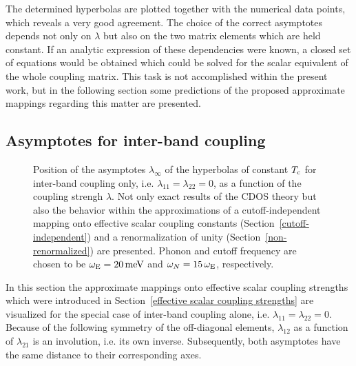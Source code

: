 The determined hyperbolas are plotted together with the numerical data points,
which reveals a very good agreement. The choice of the correct asymptotes
depends not only on $\lambda$ but also on the two matrix elements which are held
constant. If an analytic expression of these dependencies were known, a closed
set of equations would be obtained which could be solved for the scalar
equivalent of the whole coupling matrix. This task is not accomplished within
the present work, but in the following section some predictions of the proposed
approximate mappings regarding this matter are presented.

\subsection{Asymptotes for inter-band coupling}

\begin{figure}
    \small
    
    
    \caption[Asymptotes for inter-band coupling]{
        Position of the asymptotes $\lambda_\infty$ of the hyperbolas of
        constant $T \sb{\text{c}}$ for inter-band coupling only, i.e. $\lambda_{1 1} =
        \lambda_{2 2} = 0$, as a function of the coupling strengh $\lambda$. Not
        only exact results of the CDOS  theory but also the
        behavior within the approximations of a cutoff-independent mapping onto
        effective scalar coupling constants (Section~\ref{cutoff-independent})
        and a renormalization of unity (Section~\ref{non-renormalized}) are
        presented. Phonon and cutoff frequency are chosen to be $\omega \sb{\text{E}} =
        20 \, \mathrm{meV}$ and $\omega_N = 15 \, \omega \sb{\text{E}}$, respectively.}
    \label{inter-band hyperbola of constant Tc}
\end{figure}
%
In this section the approximate mappings onto effective scalar coupling
strengths which were introduced in Section~\ref{effective scalar coupling
strengths} are visualized for the special case of inter-band coupling alone,
i.e. $\lambda_{1 1} = \lambda_{2 2} = 0$. Because of the following symmetry of
the off-diagonal elements, $\lambda_{1 2}$ as a function of $\lambda_{2 1}$ is
an involution, i.e. its own inverse. Subsequently, both asymptotes have the same
distance to their corresponding axes.

